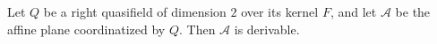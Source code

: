 Let $Q$ be a right quasifield of dimension $2$ over its kernel $F$, and let $\mathcal{A}$ be the affine plane coordinatized by $Q$. Then $\mathcal{A}$ is derivable.
